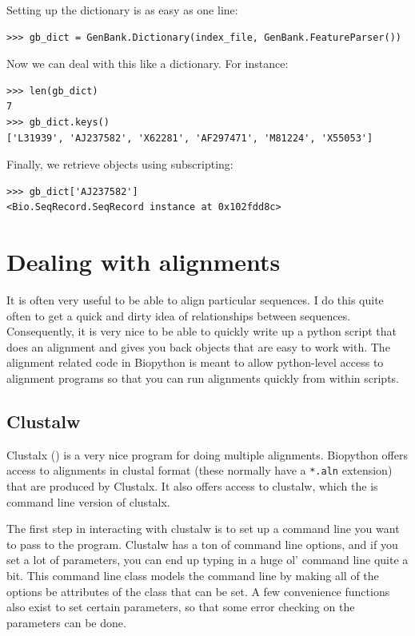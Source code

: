 \documentclass{report}
\begin{document}
Setting up the dictionary is as easy as one line:

\begin{verbatim}
>>> gb_dict = GenBank.Dictionary(index_file, GenBank.FeatureParser())
\end{verbatim}

Now we can deal with this like a dictionary. For instance:

\begin{verbatim}
>>> len(gb_dict)
7
>>> gb_dict.keys()
['L31939', 'AJ237582', 'X62281', 'AF297471', 'M81224', 'X55053']
\end{verbatim}

Finally, we retrieve objects using subscripting:

\begin{verbatim}
>>> gb_dict['AJ237582']
<Bio.SeqRecord.SeqRecord instance at 0x102fdd8c>
\end{verbatim}

\section{Dealing with alignments}

It is often very useful to be able to align particular sequences. I do this quite often to get a quick and dirty idea of relationships between sequences. Consequently, it is very nice to be able to quickly write up a python script that does an alignment and gives you back objects that are easy to work with. The alignment related code in Biopython is meant to allow python-level access to alignment programs so that you can run alignments quickly from within scripts.

\subsection{Clustalw}
\label{sec:align_clustal}

Clustalx () is a very nice program for doing multiple alignments. Biopython offers access to alignments in clustal format (these normally have a \verb|*.aln| extension) that are produced by Clustalx. It also offers access to clustalw, which the is command line version of clustalx.


The first step in interacting with clustalw is to set up a command line you want to pass to the program. Clustalw has a ton of command line options, and if you set a lot of parameters, you can end up typing in a huge ol' command line quite a bit. This command line class models the command line by making all of the options be attributes of the class that can be set. A few convenience functions also exist to set certain parameters, so that some error checking on the parameters can be done.
\end{document}
